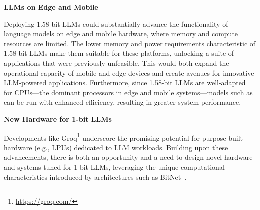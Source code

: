 \textbf{LLMs on Edge and Mobile}

Deploying 1.58-bit LLMs could substantially advance the functionality of language models on edge and mobile hardware, where memory and compute resources are limited. The lower memory and power requirements characteristic of 1.58-bit LLMs make them suitable for these platforms, unlocking a suite of applications that were previously unfeasible. This would both expand the operational capacity of mobile and edge devices and create avenues for innovative LLM-powered applications. Furthermore, since 1.58-bit LLMs are well-adapted for CPUs—the dominant processors in edge and mobile systems—models such as  can be run with enhanced efficiency, resulting in greater system performance.

\textbf{New Hardware for 1-bit LLMs}

Developments like Groq\footnote{\url{https://groq.com/}} underscore the promising potential for purpose-built hardware (e.g., LPUs) dedicated to LLM workloads. Building upon these advancements, there is both an opportunity and a need to design novel hardware and systems tuned for 1-bit LLMs, leveraging the unique computational characteristics introduced by architectures such as BitNet~\cite{bitnet}.